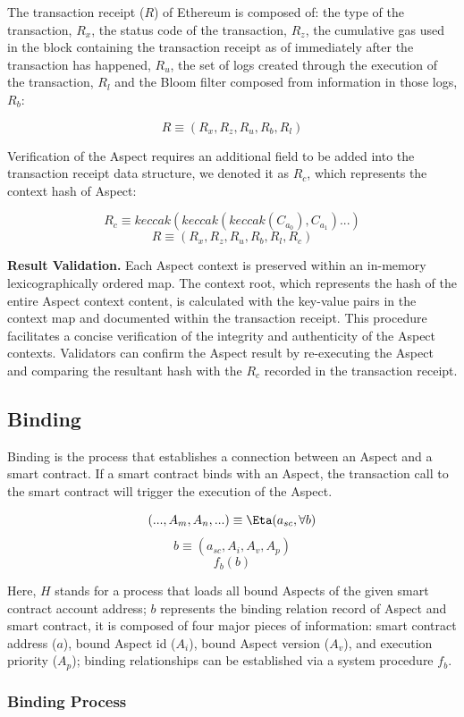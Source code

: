 The transaction receipt ($R$) of Ethereum is composed of: the type of the transaction, $R_x$, the status code of the transaction, $R_z$, the cumulative gas used in the block containing the transaction receipt as of immediately after the transaction has happened, $R_u$, the set of logs created through the execution of the transaction, $R_l$ and the Bloom filter composed from information in those logs, $R_b$:

\[
R \equiv (R_x, R_z, R_u, R_b, R_l)
\]

Verification of the Aspect requires an additional field to be added into the transaction receipt data structure, we denoted it as $R_c$, which represents the context hash of Aspect:

\[
R_c \equiv keccak(keccak(keccak(C_{a_0}),C_{a_1})...)
\]
\[
R \equiv (R_x, R_z, R_u, R_b, R_l, R_c)
\]

\textbf{Result Validation.} Each Aspect context is preserved within an in-memory lexicographically ordered map. The context root, which represents the hash of the entire Aspect context content, is calculated with the key-value pairs in the context map and documented within the transaction receipt. This procedure facilitates a concise verification of the integrity and authenticity of the Aspect contexts. Validators can confirm the Aspect result by re-executing the Aspect and comparing the resultant hash with the $R_c$ recorded in the transaction receipt.

\subsection{Binding}

Binding is the process that establishes a connection between an Aspect and a smart contract. If a smart contract binds with an Aspect, the transaction call to the smart contract will trigger the execution of the Aspect.

\[
(...,A_m, A_n,...) \equiv \Eta(a_{sc}, \forall b)
\]
\[
b \equiv (a_{sc},A_i, A_v, A_p)
\]
\[
f_{b}(b)
\]

Here, $H$ stands for a process that loads all bound Aspects of the given smart contract account address; $b$ represents the binding relation record of Aspect and smart contract, it is composed of four major pieces of information: smart contract address ($a$), bound Aspect id ($A_i$), bound Aspect version ($A_v$), and execution priority ($A_p$); binding relationships can be established via a system procedure $f_{b}$.

\subsubsection{Binding Process}

